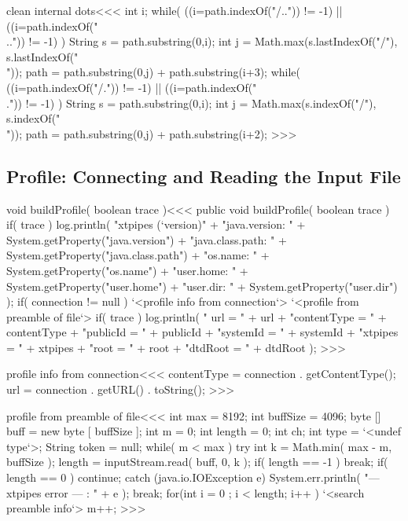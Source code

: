 \documentclass{article}
\begin{document}
\<clean internal dots\><<<
  int i;
  while(
    ((i=path.indexOf("/..")) != -1)
    ||
    ((i=path.indexOf("\\..")) != -1)
  ){
    String s = path.substring(0,i);
    int j = Math.max(s.lastIndexOf("/"), s.lastIndexOf("\\"));
    path = path.substring(0,j) + path.substring(i+3);
  }
  while(
    ((i=path.indexOf("/.")) != -1)
    ||
    ((i=path.indexOf("\\.")) != -1)
  ){
    String s = path.substring(0,i);
    int j = Math.max(s.indexOf("/"), s.indexOf("\\"));
    path = path.substring(0,j) + path.substring(i+2);
  }
>>>



\subsection{Profile: Connecting and Reading the Input File}

\<void buildProfile( boolean trace )\><<<
public void buildProfile( boolean trace ){
   if( trace ){
      log.println(
         "xtpipes (`version)"
         + "\n   java.version: "    + System.getProperty("java.version")
         + "\n   java.class.path: " + System.getProperty("java.class.path")
         + "\n   os.name: "         + System.getProperty("os.name")
         + "\n   user.home: "       + System.getProperty("user.home")
         + "\n   user.dir: "        + System.getProperty("user.dir")
           );
   }
   if( connection != null ){
     `<profile info from connection`>
   }
   `<profile from preamble of file`>
   if( trace ){
      log.println(
           " url = "           + url
         + "\n contentType = " + contentType
         + "\n publicId = "    + publicId
         + "\n systemId = "    + systemId
         + "\n xtpipes = "     + xtpipes
         + "\n root = "        + root
         + "\n dtdRoot = "     + dtdRoot
      );
}  }
>>>


\<profile info from connection\><<<
contentType = connection . getContentType();
url = connection . getURL() . toString();
>>>



\<profile from preamble of file\><<<
int max = 8192;
int buffSize = 4096;
byte [] buff = new byte [ buffSize ];
int m = 0;
int length = 0;
int ch;
int type = `<undef type`>;
String token = null;
while( m < max ){
   try{
      int k = Math.min( max - m, buffSize );
      length = inputStream.read( buff, 0, k );
      if( length == -1 ){ break; }
      if( length == 0  ){ continue; }
   } catch (java.io.IOException e){
      System.err.println( "--- xtpipes error --- : " + e );
      break;
   }
   for(int i = 0 ; i < length; i++ ){
     `<search preamble info`>
     m++;
}  }
>>>
\end{document}
